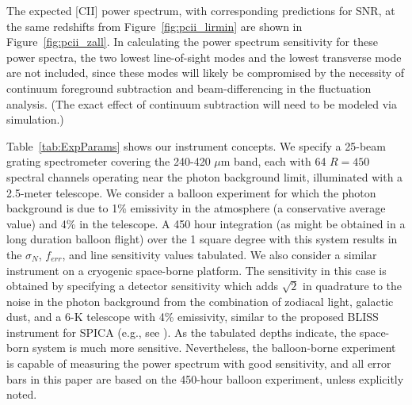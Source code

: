 \documentclass[iop,twocolappendix]{emulateapj}
\begin{document}
The expected [CII] power spectrum, with corresponding predictions for SNR, at the same redshifts from Figure~\ref{fig:pcii_lirmin} are shown in Figure~\ref{fig:pcii_zall}. In calculating the power spectrum sensitivity for these power spectra, the two lowest line-of-sight modes and the lowest transverse mode are not included, since these modes will likely be compromised by the necessity of continuum foreground subtraction and beam-differencing in the fluctuation analysis. (The exact effect of continuum subtraction will need to be modeled via simulation.)

Table~\ref{tab:ExpParams} shows our instrument concepts.  We specify a 25-beam grating spectrometer covering the 240-420 $\mu$m band, each with 64 $R=450$ spectral channels operating near the photon background limit, illuminated with a 2.5-meter telescope. We consider a balloon experiment for which the photon background is due to 1\% emissivity in the atmosphere (a conservative average value) and 4\% in the telescope. A 450 hour integration (as might be obtained in a long duration balloon flight) over the 1 square degree with this system results in the $\sigma_N$, $f_{err}$, and line sensitivity values tabulated. We also consider a similar instrument on a cryogenic space-borne platform. The sensitivity in this case is obtained by specifying a detector sensitivity which adds $\sqrt{2}$ in quadrature to the noise in the photon background from the combination of zodiacal light, galactic dust, and a 6-K telescope with 4\% emissivity, similar to the proposed BLISS instrument for SPICA (e.g., see \citet{bradford12}). As the tabulated depths indicate, the space-born system is much more sensitive. Nevertheless, the balloon-borne experiment is capable of measuring the power spectrum with good sensitivity, and all error bars in this paper are based on the 450-hour balloon experiment, unless explicitly noted. 
\end{document}
